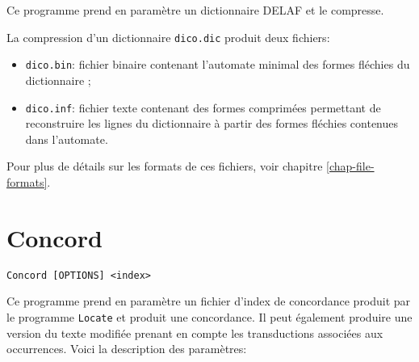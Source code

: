 \bigskip
\noindent Ce programme prend en paramètre un dictionnaire DELAF et le compresse.

La compression d’un dictionnaire \verb+dico.dic+ produit deux fichiers:
\begin{itemize}
  \item \verb+dico.bin+: fichier binaire contenant l’automate minimal des formes fléchies du
  	  dictionnaire ;
  \item \verb+dico.inf+: fichier texte contenant des formes comprimées permettant de reconstruire
les lignes du dictionnaire à partir des formes fléchies contenues dans l’automate.
\end{itemize}

\bigskip
\noindent Pour plus de détails sur les formats de ces fichiers, voir chapitre
\ref{chap-file-formats}.






\section{Concord}
\label{section-Concord}
\verb+Concord [OPTIONS] <index>+

\bigskip
\noindent Ce programme prend en paramètre un fichier d’index de concordance produit par le
programme \verb+Locate+ et produit une concordance. Il peut également produire une version
du texte modifiée prenant en compte les transductions associées aux occurrences. Voici la
description des paramètres:


